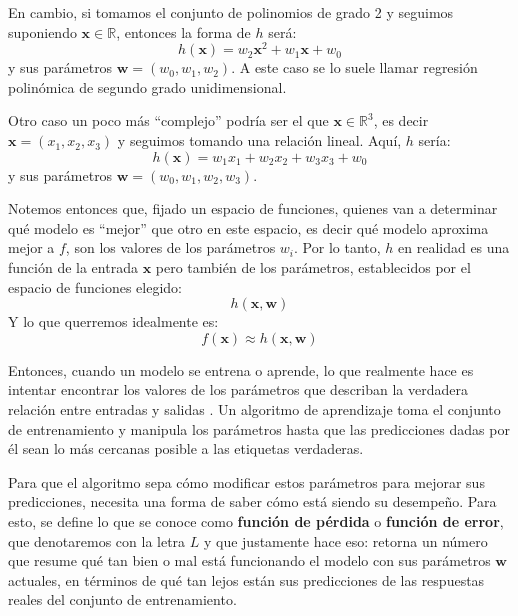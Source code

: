 \documentclass[../../main.tex]{subfiles}
\begin{document}
En cambio, si tomamos el conjunto de polinomios de grado 2 y seguimos suponiendo
\(\mathbf{x} \in \mathbb{R}\), entonces la forma de \(h\) será:
\[h(\mathbf{x}) = w_2 \mathbf{x}^2 + w_1 \mathbf{x} + w_0\] y sus parámetros
\(\bm{w}=(w_0, w_1, w_2)\). A este caso se lo suele llamar regresión polinómica de segundo
grado unidimensional.

Otro caso un poco más ``complejo'' podría ser el que \(\mathbf{x} \in \mathbb{R}^3\), es decir
\(\mathbf{x}=(x_1, x_2, x_3)\) y seguimos tomando una relación lineal. Aquí, \(h\) sería:
\[h(\mathbf{x}) = w_1 x_1 + w_2 x_2 + w_3 x_3 + w_0\] y sus parámetros \(\bm{w}=(w_0, w_1,
w_2, w_3)\)\footnotemark. 

Notemos entonces que, fijado un espacio de funciones, quienes van a determinar qué modelo
es ``mejor'' que otro en este espacio, es decir qué modelo aproxima mejor a \(f\), son los
valores de los parámetros \(w_i\). Por lo tanto, \(h\) en realidad es una función de la
entrada \(\mathbf{x}\) pero también de los parámetros, establecidos por el espacio de funciones
elegido:
\[h(\mathbf{x}, \bm{w})\]
Y lo que querremos idealmente es:
\[f(\mathbf{x}) \approx h(\mathbf{x}, \bm{w})\]

Entonces, cuando un modelo se entrena o aprende, lo que realmente hace es intentar
encontrar los valores de los parámetros que describan la verdadera relación entre entradas
y salidas \cite{prince2024understanding}. Un algoritmo de aprendizaje toma el conjunto de
entrenamiento y manipula los parámetros hasta que las predicciones dadas por él sean lo
más cercanas posible a las etiquetas verdaderas.

Para que el algoritmo sepa cómo modificar estos parámetros para mejorar sus predicciones,
necesita una forma de saber cómo está siendo su desempeño. Para esto, se define lo que se
conoce como \textbf{función de pérdida} o \textbf{función de error}, que denotaremos con
la letra \(L\) y que justamente hace eso: retorna un número que resume qué tan bien o mal
está funcionando el modelo con sus parámetros \(\bm{w}\) actuales, en términos de qué tan
lejos están sus predicciones de las respuestas reales del conjunto de entrenamiento.
\end{document}
